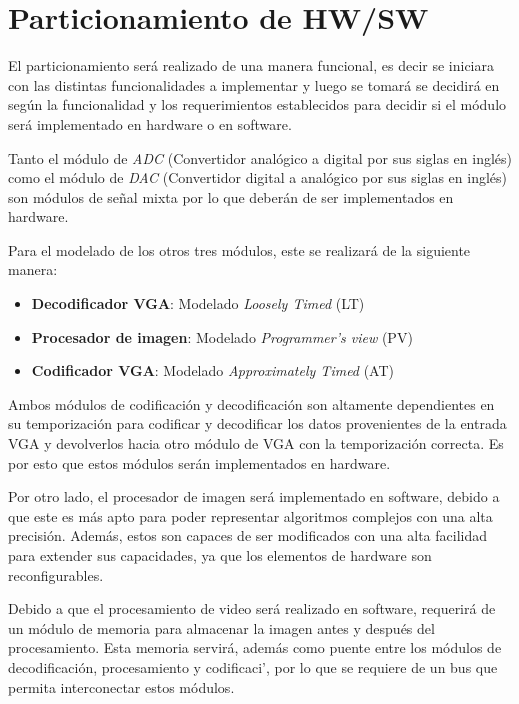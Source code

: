 \documentclass[10pt, letterpaper, conference]{IEEEtran}
\begin{document}
\section{Particionamiento de HW/SW}
\label{sec:partitioning}

El particionamiento ser\'a realizado de una manera funcional, es decir
se iniciara con las distintas funcionalidades a implementar y luego se
tomar\'a se decidir\'a en seg\'un la funcionalidad y los
requerimientos establecidos para decidir si el m\'odulo ser\'a
implementado en hardware o en software.

Tanto el m\'odulo de \emph{ADC} (Convertidor anal\'ogico a digital por
sus siglas en ingl\'es) como el m\'odulo de \emph{DAC} (Convertidor
digital a anal\'ogico por sus siglas en ingl\'es) son m\'odulos de
señal mixta por lo que deber\'an de ser implementados en hardware.

Para el modelado de los otros tres m\'odulos, este se realizar\'a de
la siguiente manera:

\begin{itemize}
    \item \textbf{Decodificador VGA}: Modelado \emph{Loosely Timed} (LT)
    \item \textbf{Procesador de imagen}: Modelado \emph{Programmer's view} (PV)
    \item \textbf{Codificador VGA}: Modelado \emph{Approximately Timed} (AT)
\end{itemize}

Ambos m\'odulos de codificaci\'on y decodificaci\'on son altamente dependientes en su
temporizaci\'on para codificar y decodificar los datos
provenientes de la entrada VGA y devolverlos hacia otro m\'odulo de VGA con la
temporizaci\'on correcta. Es por esto que estos m\'odulos ser\'an
implementados en hardware.

Por otro lado, el procesador de imagen ser\'a implementado en software,
debido a que este es m\'as apto para poder representar algoritmos
complejos con una alta precisi\'on. Adem\'as, estos son capaces de ser
modificados con una alta facilidad para extender sus capacidades, 
ya que los elementos de hardware son reconfigurables.

Debido a que el procesamiento de video ser\'a realizado en software, 
requerir\'a de un m\'odulo de memoria para almacenar la imagen antes 
y despu\'es del procesamiento. Esta memoria servir\'a, adem\'as como puente
entre los m\'odulos de decodificaci\'on, procesamiento y codificaci'\on, por
lo que se requiere de un bus que permita interconectar estos m\'odulos.
\end{document}
